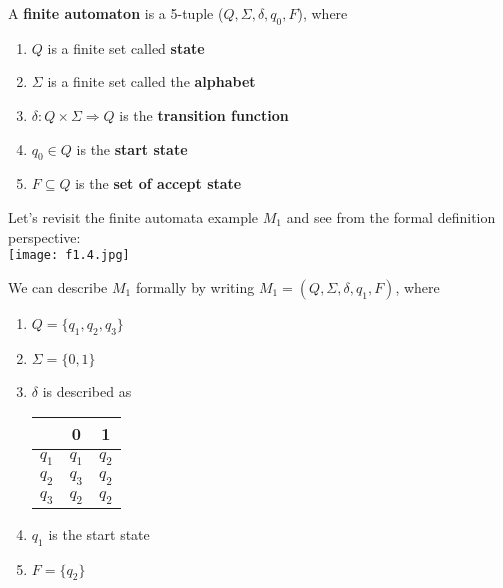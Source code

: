 \begin{definition}
    A \textbf{finite automaton} is a 5-tuple (\(Q, \Sigma, \delta, q_0, F\)), where
    \begin{enumerate}
        \item \(Q\) is a finite set called \textbf{state} 
        \item \(\Sigma\) is a finite set called the \textbf{alphabet} 
        \item \(\delta: Q \times \Sigma \Rightarrow Q\) is the \textbf{transition function}
        \item \(q_0 \in Q\) is the \textbf{start state}
        \item \(F \subseteq Q\) is the \textbf{set of accept state}         
    \end{enumerate}
\end{definition}

\begin{eg}
    Let's revisit the finite automata example \(M_1\) and see from the formal definition perspective: \\
    \texttt{[image: f1.4.jpg]}

    We can describe \(M_1\) formally by writing \(M_1 = (Q, \Sigma, \delta, q_1, F)\), where   
    \begin{enumerate}
        \item \(Q = \{q_1, q_2, q_3\}\)
        \item \(\Sigma = \{ 0, 1 \} \)  
        \item \(\delta\) is described as 
        \begin{table}[H]
            \centering
            \begin{tabular}{c|c|c}
                \toprule
                     & 0 & 1  \\
                \midrule
                   \(q_1\)  & \(q_1\)  & \(q_2\)  \\
                   \(q_2\)  & \(q_3\)  & \(q_2\)  \\
                   \(q_3\)  & \(q_2\)  & \(q_2\)  \\
                \bottomrule
            \end{tabular}
        \end{table}
        \item \(q_1\) is the start state
        \item \(F = \{ q_2 \} \)  
    \end{enumerate}
\end{eg}


